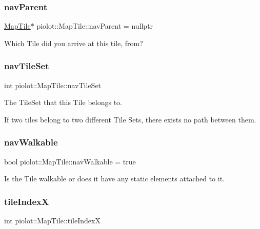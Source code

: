 \subsubsection{\texorpdfstring{nav\+Parent}{navParent}}
{\footnotesize\ttfamily \mbox{\hyperlink{classpiolot_1_1_map_tile}{Map\+Tile}}$\ast$ piolot\+::\+Map\+Tile\+::nav\+Parent = nullptr}



Which Tile did you arrive at this tile, from? 

\mbox{\label{classpiolot_1_1_map_tile_a1968deb3bc5f0c4ff4eb05995eff6fd7}} 
\subsubsection{\texorpdfstring{nav\+Tile\+Set}{navTileSet}}
{\footnotesize\ttfamily int piolot\+::\+Map\+Tile\+::nav\+Tile\+Set}



The Tile\+Set that this Tile belongs to. 

If two tiles belong to two different Tile Sets, there exists no path between them. \mbox{\label{classpiolot_1_1_map_tile_a917058380d87af864438c30f3a65c774}} 
\subsubsection{\texorpdfstring{nav\+Walkable}{navWalkable}}
{\footnotesize\ttfamily bool piolot\+::\+Map\+Tile\+::nav\+Walkable = true}



Is the Tile walkable or does it have any static elements attached to it. 

\mbox{\label{classpiolot_1_1_map_tile_ab1585fe7db159adb817540c7aa23729a}} 
\subsubsection{\texorpdfstring{tile\+IndexX}{tileIndexX}}
{\footnotesize\ttfamily int piolot\+::\+Map\+Tile\+::tile\+IndexX}

